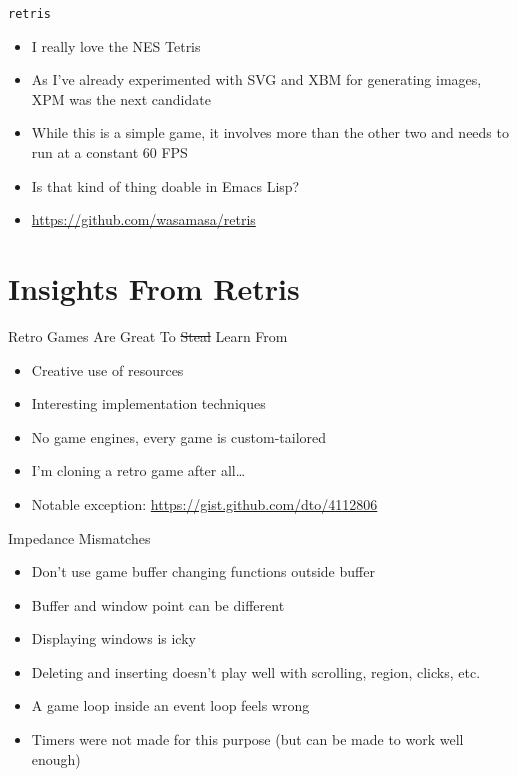 \documentclass[presentation]{beamer}
\begin{document}
\begin{frame}[fragile,label=sec-3-6]{\texttt{retris}}
 \begin{itemize}
\item I really love the NES Tetris
\item As I've already experimented with SVG and XBM for generating images,
XPM was the next candidate
\item While this is a simple game, it involves more than the other two and
needs to run at a constant 60 FPS
\item Is that kind of thing doable in Emacs Lisp?
\item \url{https://github.com/wasamasa/retris}
\end{itemize}
\end{frame}

\section{Insights From Retris}
\label{sec-4}

\begin{frame}[label=sec-4-1]{Retro Games Are Great To \sout{Steal} Learn From}
\begin{itemize}
\item Creative use of resources
\item Interesting implementation techniques
\item No game engines, every game is custom-tailored
\item I'm cloning a retro game after all\ldots{}
\item Notable exception: \url{https://gist.github.com/dto/4112806}
\end{itemize}
\end{frame}

\begin{frame}[label=sec-4-2]{Impedance Mismatches}
\begin{itemize}
\item Don't use game buffer changing functions outside buffer
\item Buffer and window point can be different
\item Displaying windows is icky
\item Deleting and inserting doesn't play well with scrolling, region,
clicks, etc.
\item A game loop inside an event loop feels wrong
\item Timers were not made for this purpose (but can be made to work well
enough)
\end{itemize}
\end{frame}
\end{document}
